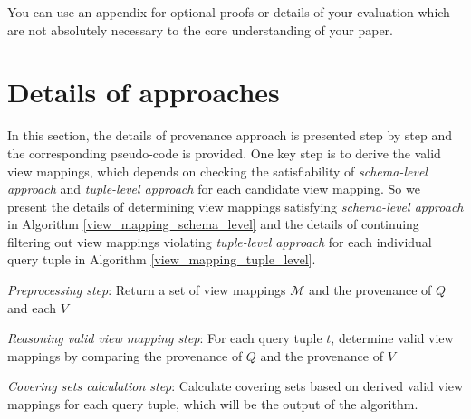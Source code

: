 \begin{appendix}
You can use an appendix for optional proofs or details of your evaluation which are not absolutely necessary to the core understanding of your paper. 

\section{Details of approaches}

In this section, the details of provenance approach is presented step by step and the corresponding pseudo-code is provided. One key step is to derive the valid view mappings, which depends on checking the satisfiability of {\em schema-level approach} and {\em tuple-level approach} for each candidate view mapping. So we present the details of 
determining view mappings satisfying {\em schema-level approach} in Algorithm \ref{view_mapping_schema_level} and the details of continuing filtering out view mappings violating {\em tuple-level approach} for each individual query tuple in Algorithm \ref{view_mapping_tuple_level}.

\begin{algorithm}[h!] 
\footnotesize


{\em Preprocessing step}: Return a set of view mappings $\mathcal{M}$ and the provenance of $Q$ and each $V$

{\em Reasoning valid view mapping step}: For each query tuple $t$, determine valid view mappings by comparing the provenance of  $Q$ and the provenance of $V$

{\em Covering sets calculation step}: Calculate covering sets based on derived valid view mappings for each query tuple, which will be the output of the algorithm.
 
    
    


\end{algorithm}
\end{appendix}
